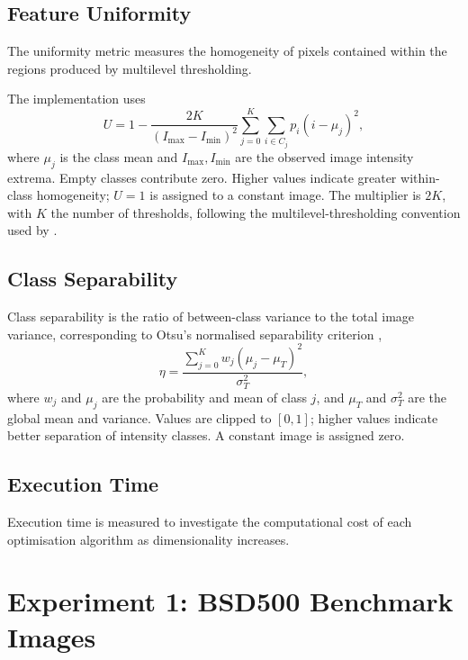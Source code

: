 \documentclass[review]{elsarticle}
\begin{document}
\subsection{Feature Uniformity}

The uniformity metric measures the homogeneity of pixels contained
within the regions produced by multilevel thresholding.

The implementation uses
\begin{equation}
U=1-\frac{2K}{(I_{\max}-I_{\min})^2}
\sum_{j=0}^{K}\sum_{i\in C_j}p_i(i-\mu_j)^2,
\end{equation}
where $\mu_j$ is the class mean and $I_{\max},I_{\min}$ are the observed
image intensity extrema. Empty classes contribute zero. Higher values
indicate greater within-class homogeneity; $U=1$ is assigned to a constant
image. The multiplier is $2K$, with $K$ the number of thresholds, following
the multilevel-thresholding convention used by \citet{sathya2011abf}.



\subsection{Class Separability}

Class separability is the ratio of between-class variance to the total image
variance, corresponding to Otsu's normalised separability criterion
\citep{otsu1979threshold},
\begin{equation}
\eta =
\frac{\sum_{j=0}^{K} w_j(\mu_j-\mu_T)^2}{\sigma_T^2},
\end{equation}
where $w_j$ and $\mu_j$ are the probability and mean of class $j$, and
$\mu_T$ and $\sigma_T^2$ are the global mean and variance. Values are
clipped to $[0,1]$; higher values indicate better separation of intensity
classes. A constant image is assigned zero.


\subsection{Execution Time}

Execution time is measured to investigate the computational cost of
each optimisation algorithm as dimensionality increases.






\section{Experiment 1: BSD500 Benchmark Images}
\end{document}
